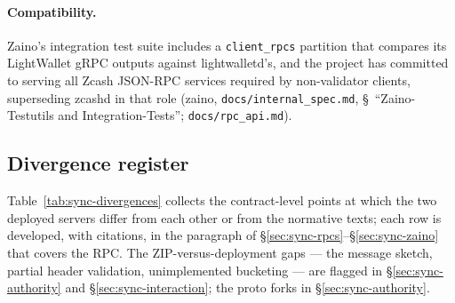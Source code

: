 \documentclass[11pt,a4paper]{article}
\theoremstyle{definition}
\begin{document}
\paragraph{Compatibility.} Zaino's integration test suite includes a
\texttt{client\_rpcs} partition that compares its LightWallet gRPC
outputs against lightwalletd's, and the project has committed to serving
all Zcash JSON-RPC services required by non-validator clients,
superseding zcashd in that role (\textsf{zaino},
\texttt{docs/internal\_spec.md}, \S~``Zaino-Testutils and
Integration-Tests''; \texttt{docs/rpc\_api.md}).

\subsection{Divergence register}\label{sec:sync-divergences}

Table~\ref{tab:sync-divergences} collects the contract-level points at
which the two deployed servers differ from each other or from the
normative texts; each row is developed, with citations, in the paragraph
of \S\ref{sec:sync-rpcs}--\S\ref{sec:sync-zaino} that covers the RPC.
The ZIP-versus-deployment gaps --- the message sketch, partial header
validation, unimplemented bucketing --- are flagged in
\S\ref{sec:sync-authority} and \S\ref{sec:sync-interaction}; the proto
forks in \S\ref{sec:sync-authority}.
\end{document}
